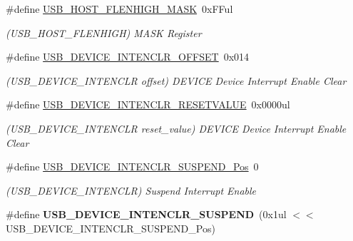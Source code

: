 \begin{DoxyCompactItemize}
\item 
\hypertarget{group___s_a_m_l21___u_s_b_ga172a214f96b81cc95c268f35c2165ab6}{}\#define \hyperlink{group___s_a_m_l21___u_s_b_ga172a214f96b81cc95c268f35c2165ab6}{U\+S\+B\+\_\+\+H\+O\+S\+T\+\_\+\+F\+L\+E\+N\+H\+I\+G\+H\+\_\+\+M\+A\+S\+K}~0x\+F\+Ful\label{group___s_a_m_l21___u_s_b_ga172a214f96b81cc95c268f35c2165ab6}

\begin{DoxyCompactList}\small\item\em (U\+S\+B\+\_\+\+H\+O\+S\+T\+\_\+\+F\+L\+E\+N\+H\+I\+G\+H) M\+A\+S\+K Register \end{DoxyCompactList}\item 
\hypertarget{group___s_a_m_l21___u_s_b_ga8c5afec703b435f3c75ede654164f916}{}\#define \hyperlink{group___s_a_m_l21___u_s_b_ga8c5afec703b435f3c75ede654164f916}{U\+S\+B\+\_\+\+D\+E\+V\+I\+C\+E\+\_\+\+I\+N\+T\+E\+N\+C\+L\+R\+\_\+\+O\+F\+F\+S\+E\+T}~0x014\label{group___s_a_m_l21___u_s_b_ga8c5afec703b435f3c75ede654164f916}

\begin{DoxyCompactList}\small\item\em (U\+S\+B\+\_\+\+D\+E\+V\+I\+C\+E\+\_\+\+I\+N\+T\+E\+N\+C\+L\+R offset) D\+E\+V\+I\+C\+E Device Interrupt Enable Clear \end{DoxyCompactList}\item 
\hypertarget{group___s_a_m_l21___u_s_b_ga445b817a6e0c0df3659d91b12dfd8c71}{}\#define \hyperlink{group___s_a_m_l21___u_s_b_ga445b817a6e0c0df3659d91b12dfd8c71}{U\+S\+B\+\_\+\+D\+E\+V\+I\+C\+E\+\_\+\+I\+N\+T\+E\+N\+C\+L\+R\+\_\+\+R\+E\+S\+E\+T\+V\+A\+L\+U\+E}~0x0000ul\label{group___s_a_m_l21___u_s_b_ga445b817a6e0c0df3659d91b12dfd8c71}

\begin{DoxyCompactList}\small\item\em (U\+S\+B\+\_\+\+D\+E\+V\+I\+C\+E\+\_\+\+I\+N\+T\+E\+N\+C\+L\+R reset\+\_\+value) D\+E\+V\+I\+C\+E Device Interrupt Enable Clear \end{DoxyCompactList}\item 
\hypertarget{group___s_a_m_l21___u_s_b_gad00cc659a129e5fa034c543827805378}{}\#define \hyperlink{group___s_a_m_l21___u_s_b_gad00cc659a129e5fa034c543827805378}{U\+S\+B\+\_\+\+D\+E\+V\+I\+C\+E\+\_\+\+I\+N\+T\+E\+N\+C\+L\+R\+\_\+\+S\+U\+S\+P\+E\+N\+D\+\_\+\+Pos}~0\label{group___s_a_m_l21___u_s_b_gad00cc659a129e5fa034c543827805378}

\begin{DoxyCompactList}\small\item\em (U\+S\+B\+\_\+\+D\+E\+V\+I\+C\+E\+\_\+\+I\+N\+T\+E\+N\+C\+L\+R) Suspend Interrupt Enable \end{DoxyCompactList}\item 
\hypertarget{group___s_a_m_l21___u_s_b_ga06b33c45f8e88b92dc151ab43ed3237d}{}\#define {\bfseries U\+S\+B\+\_\+\+D\+E\+V\+I\+C\+E\+\_\+\+I\+N\+T\+E\+N\+C\+L\+R\+\_\+\+S\+U\+S\+P\+E\+N\+D}~(0x1ul $<$$<$ U\+S\+B\+\_\+\+D\+E\+V\+I\+C\+E\+\_\+\+I\+N\+T\+E\+N\+C\+L\+R\+\_\+\+S\+U\+S\+P\+E\+N\+D\+\_\+\+Pos)\label{group___s_a_m_l21___u_s_b_ga06b33c45f8e88b92dc151ab43ed3237d}


\end{DoxyCompactItemize}
